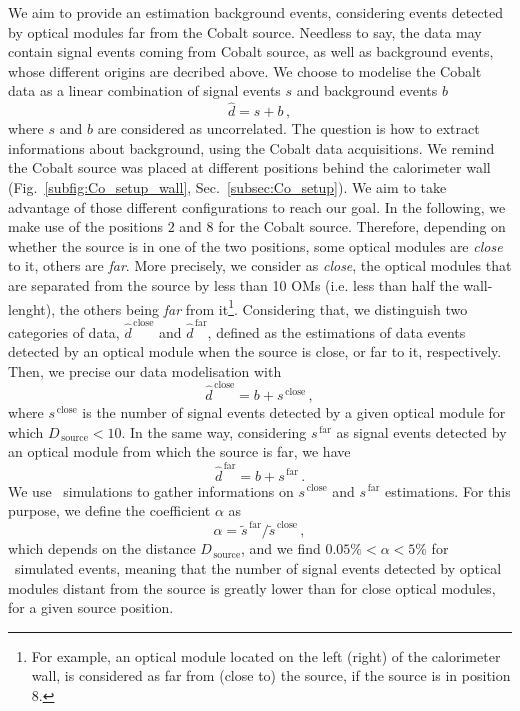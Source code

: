 We aim to provide an estimation background events, considering events detected by optical modules far from the Cobalt source.
Needless to say, the data may contain signal events coming from Cobalt source, as well as background events, whose different origins are decribed above.
We choose to modelise the Cobalt data as a linear combination of signal events $s$ and background events $b$
\begin{equation}
  \hat{d}=s+b\,,
  \label{eq:estimation_data}
\end{equation}
where $s$ and $b$ are considered as uncorrelated.
The question is how to extract informations about background, using the Cobalt data acquisitions.
We remind the Cobalt source was placed at different positions behind the calorimeter wall (Fig.~\ref{subfig:Co_setup_wall}, Sec.~\ref{subsec:Co_setup}).
We aim to take advantage of those different configurations to reach our goal.
In the following, we make use of the positions $2$ and $8$ for the Cobalt source.
Therefore, depending on whether the source is in one of the two positions, some optical modules are \emph{close} to it, others are \emph{far}.
More precisely, we consider as \emph{close}, the optical modules that are separated from the source by less than 10 OMs (i.e. less than half the wall-lenght), the others being \emph{far} from it\footnote{For example, an optical module located on the left (right) of the calorimeter wall, is considered as far from (close to) the source, if the source is in position $8$.}.
Considering that, we distinguish two categories of data, $\hat{d}^{\,\text{close}}$ and $\hat{d}^{\,\text{far}}$, defined as the estimations of data events detected by an optical module when the source is close, or far to it, respectively.
Then, we precise our data modelisation with
\begin{equation}
  \hat{d}^{\,\text{close}} = b + s^{\,\text{close}}\,,
  \label{eq:estimation_data_close}
\end{equation}
where $s^{\,\text{close}}$ is the number of signal events detected by a given optical module for which $D_{\,\text{source}}<10$.
In the same way, considering $s^{\,\text{far}}$ as signal events detected by an optical module from which the source is far, we have
\begin{equation}
  \hat{d}^{\,\text{far}} = b + s^{\,\text{far}}\,.
  \label{eq:estimation_data_far}
\end{equation}
We use \Co\ simulations to gather informations on $s^{\,\text{close}}$ and $s^{\,\text{far}}$ estimations.
For this purpose, we define the coefficient $\alpha$ as
\begin{equation}
  \alpha = \tilde{s}^{\,\text{far}}/\tilde{s}^{\,\text{close}}\,,
\end{equation}
which depends on the distance $D_{\,\text{source}}$, and we find $0.05 \% < \alpha < 5 \%$ for \Co\ simulated events, meaning that the number of signal events detected by optical modules distant from the source is greatly lower than for close optical modules, for a given source position.

